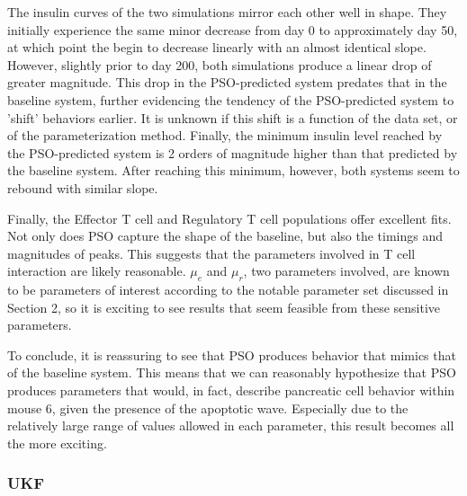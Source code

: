 \par The insulin curves of the two simulations mirror each other well in shape. They initially experience the same minor decrease from day 0 to approximately day 50, at which point the begin to decrease linearly with an almost identical slope. However, slightly prior to day 200, both simulations produce a linear drop of greater magnitude. This drop in the PSO-predicted system predates that in the baseline system, further evidencing the tendency of the PSO-predicted system to 'shift' behaviors earlier. It is unknown if this shift is a function of the data set, or of the parameterization method. Finally, the minimum insulin level reached by the PSO-predicted system is 2 orders of magnitude higher than that predicted by the baseline system. After reaching this minimum, however, both systems seem to rebound with similar slope.  
\par Finally, the Effector T cell and Regulatory T cell populations offer excellent fits. Not only does PSO capture the shape of the baseline, but also the timings and magnitudes of peaks. This suggests that the parameters involved in T cell interaction are likely reasonable. $\mu_e$ and $\mu_r$, two parameters involved, are known to be parameters of interest according to the notable parameter set discussed in Section 2, so it is exciting to see results that seem feasible from these sensitive parameters. 
\par To conclude, it is reassuring to see that PSO produces behavior that mimics that of the baseline system. This means that we can reasonably hypothesize that PSO produces parameters that would, in fact, describe pancreatic cell behavior within mouse 6, given the presence of the apoptotic wave. Especially due to the relatively large range of values
allowed in each parameter, this result becomes all the more exciting. 
\subsubsection{UKF}

